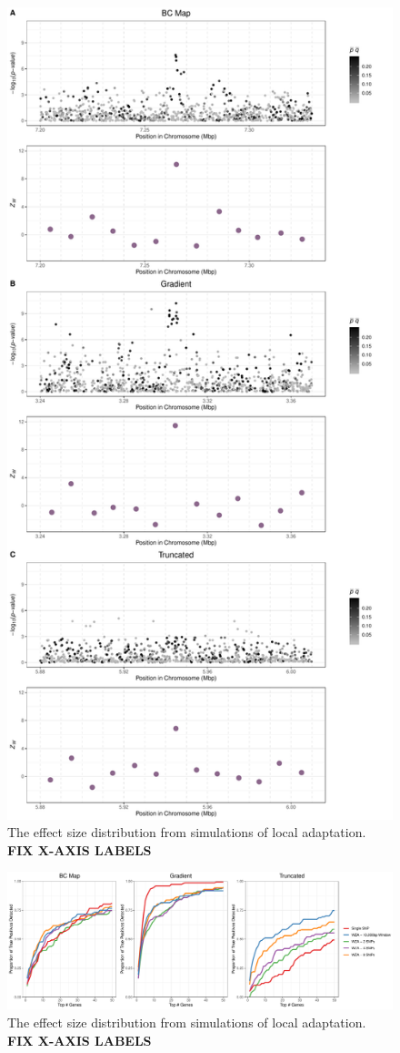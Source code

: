 \documentclass[10pt,twoside,lineno, twocolumn]{GSA_format}
\begin{document}
\begin{figure}[H]
  \includegraphics[height=0.9\textheight,keepaspectratio]{Plots/all_maps_plot_demo.pdf}
  \caption{The effect size distribution from simulations of local adaptation. \textbf{FIX X-AXIS LABELS}}

  \label{fig:demoPlots}
\end{figure}

\pagebreak

\begin{figure}[H]
  \includegraphics[width = \textwidth,keepaspectratio]{Plots/SNP_number.pdf}
  \caption{The effect size distribution from simulations of local adaptation. \textbf{FIX X-AXIS LABELS}}

  \label{fig:demoPlots}
\end{figure}
\end{document}
